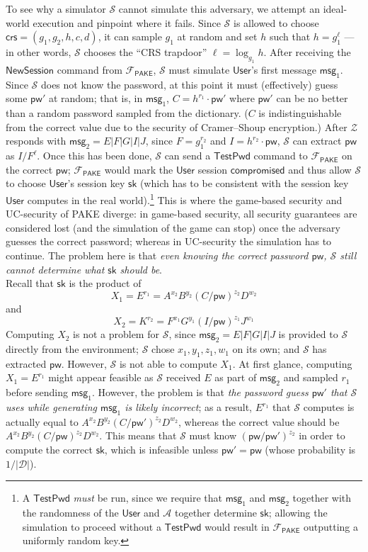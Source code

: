 \documentclass[12pt,a4paper]{article}
\newcommand{\simulator}{\mathcal{S}}
\newcommand{\env}{\mathcal{Z}}
\newcommand{\adv}{\mathcal{A}}
\newcommand{\pake}{\mathcal{F}_{\mathsf{PAKE}}}
\newcommand{\user}{\mathsf{User}}
\newcommand{\sk}{\mathsf{sk}}
\newcommand{\pw}{\mathsf{pw}}
\newcommand{\crs}{\mathsf{crs}}
\newcommand{\newsession}{\mathsf{NewSession}}
\newcommand{\testpwd}{\mathsf{TestPwd}}
\newcommand{\compromised}{\mathsf{compromised}}
\newcommand{\msg}[1]{\mathsf{msg}_{#1}}
\begin{document}
	To see why a simulator $\simulator$ cannot simulate this adversary, we attempt an ideal-world execution and pinpoint where it fails. Since $\simulator$ is allowed to choose $\crs=(g_1, g_2, h, c, d)$, it can sample $g_1$ at random and set $h$ such that $h=g_1^{\ell}$ --- in other words, $\simulator$ chooses the ``CRS trapdoor'' $\ell = \log_{g_1} h$. After receiving the $\newsession$ command from $\pake$, $\simulator$ must simulate $\user$'s first message $\msg{1}$. Since $\simulator$ does not know the password, at this point it must (effectively) guess some $\pw'$ at random; that is, in $\msg{1}$, $C=h^{r_1}\cdot\pw'$ where $\pw'$ can be no better than a random password sampled from the dictionary. ($C$ is indistinguishable from the correct value due to the security of Cramer--Shoup encryption.) After $\env$ responds with $\msg{2} = E|F|G|I|J$, since $F = g_1^{r_2}$ and $I = h^{r_2} \cdot \pw$, $\simulator$ can extract $\pw$ as $I/F^\ell$. Once this has been done, $\simulator$ can send a $\testpwd$ command to $\pake$ on the correct $\pw$; $\pake$ would mark the $\user$ session $\compromised$ and thus allow $\simulator$ to choose $\user$'s session key $\sk$ (which has to be consistent with the session key $\user$ computes in the real world).\footnote{A $\testpwd$ \textit{must} be run, since we require that $\msg{1}$ and $\msg{2}$ together with the randomness of the $\user$ and $\adv$ together determine $\sk$; allowing the simulation to proceed without a $\testpwd$ would result in $\pake$ outputting a uniformly random key.} This is where the game-based security and UC-security of PAKE diverge: in game-based security, all security guarantees are considered lost (and the simulation of the game can stop) once the adversary guesses the correct password; whereas in UC-security the simulation has to continue. The problem here is that \emph{even knowing the correct password $\pw$, $\simulator$ still cannot determine what $\sk$ should be}.\\

Recall that $\sk$ is the product of
\[
X_1 = E^{r_1} = A^{x_2}B^{y_2}(C/\pw)^{z_2}D^{w_2}
\]
and
\[
X_2 = K^{r_2} = F^{x_1}G^{y_1}(I/\pw)^{z_1}J^{w_1}
\]
Computing $X_2$ is not a problem for $\simulator$, since $\msg{2} = E|F|G|I|J$ is provided to $\simulator$ directly from the environment; $\simulator$ chose $x_1, y_1, z_1, w_1$ on its own; and $\simulator$ has extracted $\pw$. However, $\simulator$ is not able to compute $X_1$. At first glance, computing $X_1 = E^{r_1}$ might appear feasible as $\simulator$ received $E$ as part of $\msg{2}$ and sampled $r_1$ before sending $\msg{1}$. However, the problem is that \emph{the password guess $\pw'$ that $\simulator$ uses while generating $\msg{1}$ is likely incorrect}; as a result, $E^{r_1}$ that $\simulator$ computes is actually equal to $A^{x_2}B^{y_2}(C/\pw')^{z_2}D^{w_2}$, whereas the correct value should be $A^{x_2}B^{y_2}(C/\pw)^{z_2}D^{w_2}$. This means that $\simulator$ must know $(\pw/\pw')^{z_2}$ in order to compute the correct $\sk$, which is infeasible unless $\pw'=\pw$ (whose probability is $1/\mathcal{|D|}$).
\end{document}
